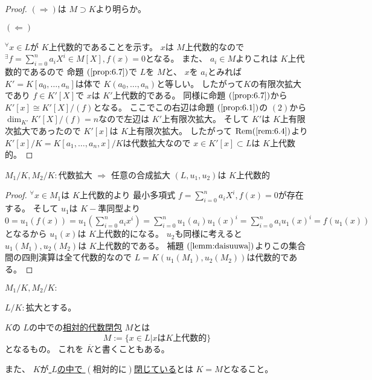 \documentclass[../master_galois_theory]{subfiles}
\begin{document}
\begin{proof}
  $(\Rightarrow)$は $M \supset K$より明らか。

  $(\Leftarrow)$

  ${}^\forall x \in L$が $K$上代数的であることを示す。
  $x$は $M$上代数的なので ${}^\exists f = \sum_{i=0}^n a_i X^i \in M[X] , f(x) = 0$となる。
  また、 $a_i \in M$よりこれは $K$上代数的であるので
  命題 $(\mathrm{\ref{prop:6.7}})$で $L$を $M$と、 $x$を $a_i$とみれば
  $K' = K[a_0 , \dots , a_n]$は体で $K(a_0 , \dots , a_n)$と等しい。
  したがって$K$の有限次拡大であり $f \in K'[X]$で $x$は $K'$上代数的である。
  同様に命題 $(\mathrm{\ref{prop:6.7}})$から $K'[x] \cong K'[X]/(f)$となる。
  ここでこの右辺は命題 $(\mathrm{\ref{prop:6.1}})$の $(2)$から
  $\dim_{K'} K'[X]/(f) = n$なので左辺は $K'$上有限次拡大。
  そして $K'$は $K$上有限次拡大であったので $K'[x]$は $K$上有限次拡大。
  したがって $\mathrm{Rem} (\mathrm{\ref{rem:6.4}})$より
  $K'[x]/K = K[a_1 , \dots , a_n , x]/K$は代数拡大なので
  $x \in K'[x] \subset L$は $K$上代数的。
\end{proof}

\begin{prop}
  $M_1/K , M_2/K:$代数拡大 $\Rightarrow$ 任意の合成拡大 $(L,u_1,u_2)$は $K$上代数的
\end{prop}

\begin{proof}
  ${}^\forall x \in M_1$は $K$上代数的より
  最小多項式 $f = \sum_{i=0}^n a_i X^i , f(x) = 0$が存在する。
  そして $u_1$は $K-$準同型より $0 = u_1(f(x)) = u_1(\sum_{i=0}^n a_i x^i) = \sum_{i=0}^n u_1(a_i) u_1(x)^i = \sum_{i=0}^n a_i u_1(x)^i = f(u_1(x))$
  となるから $u_1(x)$は $K$上代数的になる。
  $u_2$も同様に考えると $u_1(M_1) , u_2(M_2)$は $K$上代数的である。
  補題 $(\mathrm{\ref{lemm:daisuuwa}})$よりこの集合間の四則演算は全て代数的なので
  $L = K(u_1(M_1) , u_2(M_2))$は代数的である。
\end{proof}

\begin{prop}
  $M_1/K , M_2/K:$
\end{prop}

\begin{defi}
  $L/K:$拡大とする。

  $K$の $L$の中での\underline{相対的代数閉包} $M$とは
  \[
  M := \{ x \in L | x は K上代数的\}
  \]
  となるもの。
  これを $\overline{K}$と書くこともある。

  また、 $K$が\underline{ $L$の中で $(相対的に)$閉じている}とは
  $K = M$となること。
\end{defi}
\end{document}
